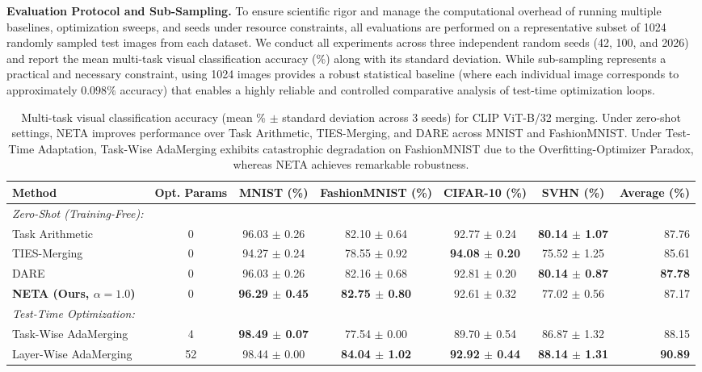 \textbf{Evaluation Protocol and Sub-Sampling.} To ensure scientific rigor and manage the computational overhead of running multiple baselines, optimization sweeps, and seeds under resource constraints, all evaluations are performed on a representative subset of 1024 randomly sampled test images from each dataset. We conduct all experiments across three independent random seeds (42, 100, and 2026) and report the mean multi-task visual classification accuracy (\%) along with its standard deviation. While sub-sampling represents a practical and necessary constraint, using 1024 images provides a robust statistical baseline (where each individual image corresponds to approximately $0.098\%$ accuracy) that enables a highly reliable and controlled comparative analysis of test-time optimization loops.

\begin{table}[t]
\caption{Multi-task visual classification accuracy (mean \% $\pm$ standard deviation across 3 seeds) for CLIP ViT-B/32 merging. Under zero-shot settings, NETA improves performance over Task Arithmetic, TIES-Merging, and DARE across MNIST and FashionMNIST. Under Test-Time Adaptation, Task-Wise AdaMerging exhibits catastrophic degradation on FashionMNIST due to the Overfitting-Optimizer Paradox, whereas NETA achieves remarkable robustness.}
\label{tab:results}
\vskip 0.15in
\begin{center}
\begin{small}
\begin{sc}
\setlength{\tabcolsep}{4pt}
\begin{tabular}{lcccccr}
\toprule
Method & Opt. Params & MNIST (\%) & FashionMNIST (\%) & CIFAR-10 (\%) & SVHN (\%) & Average (\%) \\
\midrule
\textit{Zero-Shot (Training-Free):} \\
Task Arithmetic & 0 & 96.03 $\pm$ 0.26 & 82.10 $\pm$ 0.64 & 92.77 $\pm$ 0.24 & \textbf{80.14 $\pm$ 1.07} & 87.76 \\
TIES-Merging & 0 & 94.27 $\pm$ 0.24 & 78.55 $\pm$ 0.92 & \textbf{94.08 $\pm$ 0.20} & 75.52 $\pm$ 1.25 & 85.61 \\
DARE & 0 & 96.03 $\pm$ 0.26 & 82.16 $\pm$ 0.68 & 92.81 $\pm$ 0.20 & \textbf{80.14 $\pm$ 0.87} & \textbf{87.78} \\
\textbf{NETA (Ours, $\alpha=1.0$)} & 0 & \textbf{96.29 $\pm$ 0.45} & \textbf{82.75 $\pm$ 0.80} & 92.61 $\pm$ 0.32 & 77.02 $\pm$ 0.56 & 87.17 \\
\midrule
\textit{Test-Time Optimization:} \\
Task-Wise AdaMerging & 4 & \textbf{98.49 $\pm$ 0.07} & 77.54 $\pm$ 0.00 & 89.70 $\pm$ 0.54 & 86.87 $\pm$ 1.32 & 88.15 \\
Layer-Wise AdaMerging & 52 & 98.44 $\pm$ 0.00 & \textbf{84.04 $\pm$ 1.02} & \textbf{92.92 $\pm$ 0.44} & \textbf{88.14 $\pm$ 1.31} & \textbf{90.89} \\
\bottomrule
\end{tabular}
\end{sc}
\end{small}
\end{center}
\vskip -0.1in
\end{table}

